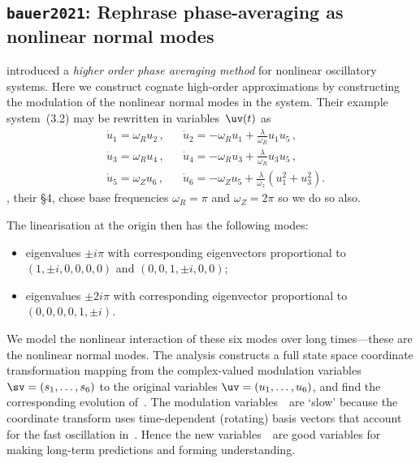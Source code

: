\subsection{\texttt{bauer2021}: Rephrase phase-averaging as nonlinear normal modes} 
\label{bauer2021}

\cite{Bauer2021} introduced a \emph{higher order phase averaging method} for nonlinear oscillatory systems. Here we construct cognate high-order approximations by constructing the modulation of the nonlinear normal modes in the system. 
Their example system~(3.2) may be rewritten in variables~\(\uv(t)\) as
\begin{align*}
&\dot u_1=\omega_R u_2\,,
&&\dot u_2=-\omega_Ru_1 +\frac\lambda{\omega_R}u_1u_5\,,
\\&\dot u_3=\omega_R u_4\,,
&&\dot u_4=-\omega_Ru_3+\frac\lambda{\omega_R}u_3u_5\,,
\\&\dot u_5=\omega_Z u_6\,,
&&\dot u_6=-\omega_Zu_5+\frac\lambda{\omega_z}(u_1^2+u_3^2).
\end{align*}
\cite{Bauer2021}, their \S4, chose base frequencies \(\omega_R=\pi\) and \(\omega_Z=2\pi\) so we do so also.

The linearisation at the origin then has the following modes:
\begin{itemize}
\item eigenvalues \(\pm i\pi\) with corresponding eigenvectors proportional to \((1,\pm i,0,0,0,0)\) and \((0,0,1,\pm i,0,0)\);
\item eigenvalues \(\pm 2i\pi\) with corresponding eigenvector proportional to \((0,0,0,0,1,\pm i)\).
\end{itemize}
We model the nonlinear interaction of these six modes over long times---these are the nonlinear normal modes.
The analysis constructs a full state space coordinate transformation mapping from the complex-valued modulation variables \(\sv=(s_1,\ldots,s_6)\) to the original variables \(\uv=(u_1,\ldots,u_6)\), and find the corresponding evolution of~\sv.
The modulation variables~\sv\ are `slow' because the coordinate transform uses time-dependent (rotating) basis vectors that account for the fast oscillation in~\uv.
Hence the new variables~\sv\ are good variables for making long-term predictions and forming understanding.

